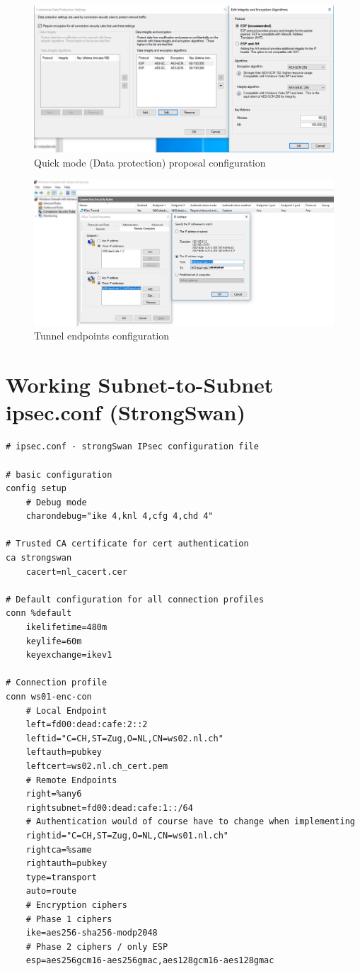 \documentclass[a4paper]{report}
\begin{document}
\begin{figure}[h!]
	\includegraphics[width=\linewidth,keepaspectratio]{IPsec_Defaults_DPS_Conf}
	\caption{Quick mode (Data protection) proposal configuration}
\end{figure}

\begin{figure}[h!]
	\includegraphics[width=\linewidth,keepaspectratio]{IPsec_Tunnel_Endpoint_Conf}
	\caption{Tunnel endpoints configuration}
\end{figure}

\chapter{Working Subnet-to-Subnet ipsec.conf (StrongSwan)}
\label{app-sec:WorkingConf}

\begin{lstlisting}
# ipsec.conf - strongSwan IPsec configuration file

# basic configuration
config setup
	# Debug mode
	charondebug="ike 4,knl 4,cfg 4,chd 4"

# Trusted CA certificate for cert authentication
ca strongswan
	cacert=nl_cacert.cer

# Default configuration for all connection profiles
conn %default
	ikelifetime=480m
	keylife=60m
	keyexchange=ikev1

# Connection profile
conn ws01-enc-con
	# Local Endpoint
	left=fd00:dead:cafe:2::2
	leftid="C=CH,ST=Zug,O=NL,CN=ws02.nl.ch"
	leftauth=pubkey
	leftcert=ws02.nl.ch_cert.pem
	# Remote Endpoints
	right=%any6
	rightsubnet=fd00:dead:cafe:1::/64
	# Authentication would of course have to change when implementing
	rightid="C=CH,ST=Zug,O=NL,CN=ws01.nl.ch"
	rightca=%same
	rightauth=pubkey
	type=transport
	auto=route
	# Encryption ciphers
	# Phase 1 ciphers
	ike=aes256-sha256-modp2048
	# Phase 2 ciphers / only ESP
	esp=aes256gcm16-aes256gmac,aes128gcm16-aes128gmac
\end{lstlisting}
\end{document}
